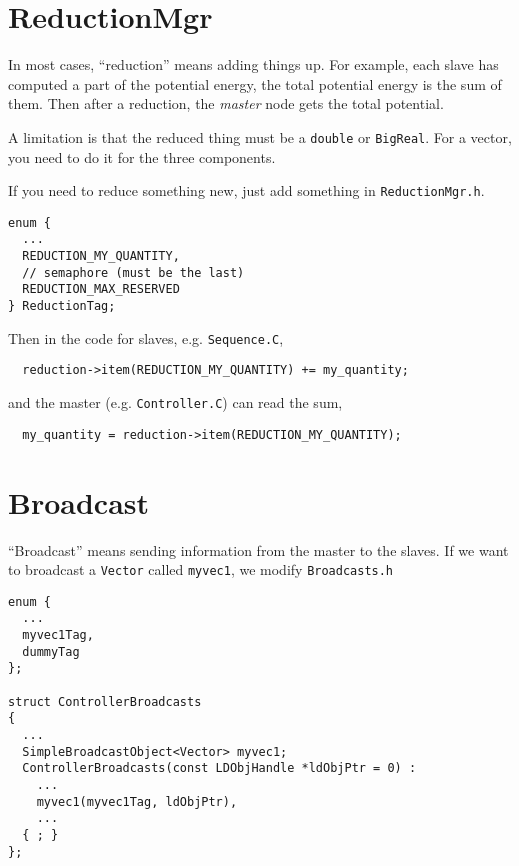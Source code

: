 \documentclass{article}
\begin{document}

\section{\label{sec:reduction}ReductionMgr}

In most cases,
``reduction'' means adding things up.
%
For example, each slave has computed
a part of the potential energy,
the total potential energy is the sum of them.
%
Then after a reduction,
the \emph{master} node gets the total potential.

A limitation is that the reduced thing
must be a \texttt{double} or \texttt{BigReal}.
%
For a vector, you need to do it for the three components.
%

If you need to reduce something new,
just add something in \texttt{ReductionMgr.h}.
\begin{lstlisting}
enum {
  ...
  REDUCTION_MY_QUANTITY,
  // semaphore (must be the last)
  REDUCTION_MAX_RESERVED
} ReductionTag;
\end{lstlisting}
%
Then in the code for slaves, e.g. \texttt{Sequence.C},
%
\begin{lstlisting}
  reduction->item(REDUCTION_MY_QUANTITY) += my_quantity;
\end{lstlisting}
%
and the master (e.g. \texttt{Controller.C}) can read the sum,
%
\begin{lstlisting}
  my_quantity = reduction->item(REDUCTION_MY_QUANTITY);
\end{lstlisting}


\section{\label{sec:broadcast}Broadcast}

``Broadcast'' means sending information from the master
to the slaves.
%
If we want to broadcast a \texttt{Vector} called \texttt{myvec1},
we modify \texttt{Broadcasts.h}
%
\begin{lstlisting}
enum {
  ...
  myvec1Tag,
  dummyTag
};

struct ControllerBroadcasts
{
  ...
  SimpleBroadcastObject<Vector> myvec1;
  ControllerBroadcasts(const LDObjHandle *ldObjPtr = 0) :
    ...
    myvec1(myvec1Tag, ldObjPtr),
    ...
  { ; }
};
\end{lstlisting}
\end{document}
